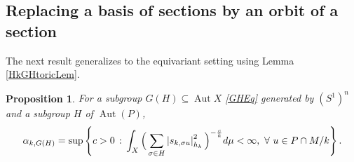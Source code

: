 \documentclass{article}
\renewcommand{\>}{\rightarrow}
\DeclareMathOperator{\Aut}{Aut}
\theoremstyle{plain}
\newtheorem{proposition}[theorem]{Proposition}
\theoremstyle{definition}
\def\lb#1{\label{#1}}
\begin{document}
\subsection{Replacing a basis of sections by an orbit of a section}
\lb{DemaillyProbSubSec}

The next result generalizes \cite[Proposition 2.1]{Shi10}
to the equivariant setting using Lemma \ref{HkGHtoricLem}. 


\begin{proposition}
\label{analytic alpha_k,G}
For a subgroup $G(H)\subseteq\Aut X$ \eqref{GHEq} 
generated by $(S^1)^n$ and a subgroup $H$ of $\Aut(P)$,
\begin{equation}\label{alpha_{k,G}}
    \alpha_{k,G(H)}=\sup\left\{c>0\,:\,\int_X\Big(\sum_{\sigma\in H}\left|s_{k,\sigma u}\right|_{h_k}^2\Big)^{-\frac{c}{k}}d\mu<\infty,~\forall~u\in P\cap M/k\right\}.
\end{equation}
\end{proposition}
\end{document}
